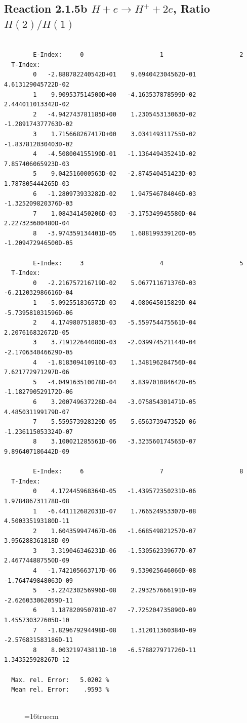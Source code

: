 \documentclass[12pt,dvips]{article}
\begin{document}
\newpage
\subsection{
Reaction 2.1.5b  $H + e \rightarrow H^+ + 2e$, Ratio $H(2)/H(1)$
}


\begin{small}\begin{verbatim}

        E-Index:     0                     1                     2
  T-Index:
        0   -2.888782240542D+01    9.694042304562D-01    4.613129045722D-02
        1    9.909537514500D+00   -4.163537878599D-02    2.444011013342D-02
        2   -4.942743781185D+00    1.230545313063D-02   -1.289174377763D-02
        3    1.715668267417D+00    3.034149311755D-02   -1.837812030403D-02
        4   -4.508004155190D-01   -1.136449435241D-02    7.857406065923D-03
        5    9.042516000563D-02   -2.874540451423D-03    1.787805444265D-03
        6   -1.280973933282D-02    1.947546784046D-03   -1.325209820376D-03
        7    1.084341450206D-03   -3.175349945580D-04    2.227323600480D-04
        8   -3.974359134401D-05    1.688199339120D-05   -1.209472946500D-05

        E-Index:     3                     4                     5
  T-Index:
        0   -2.216757216719D-02    5.067711671376D-03   -6.212032986616D-04
        1   -5.092551836572D-03    4.080645015829D-04   -5.739581031596D-06
        2    4.174980751883D-03   -5.559754475561D-04    2.207616832672D-05
        3    3.719122644080D-03   -2.039974521144D-04   -2.170634046629D-05
        4   -1.818309410916D-03    1.348196284756D-04    7.621772971297D-06
        5   -4.049163510078D-04    3.839701084642D-05   -1.182790529172D-06
        6    3.200749637228D-04   -3.075854301471D-05    4.485031199179D-07
        7   -5.559573928329D-05    5.656373947352D-06   -1.236115053324D-07
        8    3.100021285561D-06   -3.323560174565D-07    9.896407186442D-09

        E-Index:     6                     7                     8
  T-Index:
        0    4.172445968364D-05   -1.439572350231D-06    1.978486731178D-08
        1   -6.441112682031D-07    1.766524953307D-08    4.500335193180D-11
        2    1.604359947467D-06   -1.668549821257D-07    3.956288361818D-09
        3    3.319046346231D-06   -1.530562339677D-07    2.467744887550D-09
        4   -1.742105663717D-06    9.539025646066D-08   -1.764749848063D-09
        5   -3.224230256996D-08    2.293257666191D-09   -2.626033062059D-11
        6    1.187820950781D-07   -7.725204735890D-09    1.455730327605D-10
        7   -1.829679294498D-08    1.312011360384D-09   -2.576831583186D-11
        8    8.003219743811D-10   -6.578827971726D-11    1.343525928267D-12

  Max. rel. Error:   5.0202 %
  Mean rel. Error:    .9593 %


\end{verbatim}\end{small}
\begin{figure} \label{2.1.5b}
\epsfxsize=16truecm
\end{figure}
\end{document}
